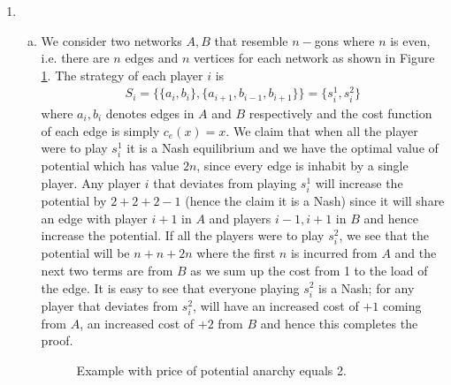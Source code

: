 \documentclass[a4paper,12pt]{article}
\theoremstyle{definition}
\begin{document}
\begin{enumerate}
\item
\begin{enumerate}[(a)]
\item We consider two networks $A, B$ that resemble $n-$gons where $n$ is even, i.e. there are $n$ edges and $n$ vertices for each network as shown in Figure \ref{fig:ngon}. The strategy of each player $i$ is 
\begin{align*}
S_i=\{\{a_i,b_i\},\{a_{i+1},b_{i-1},b_{i+1}\}\}=\{s_i^1,s_i^2\}
\end{align*}
where $a_i,b_i$ denotes edges in $A$ and $B$ respectively and the cost function of each edge is simply $c_e(x)=x$. We claim that when all the player were to play $s_i^1$ it is a Nash equilibrium and we have the optimal value of potential which has value $2n$, since every edge is inhabit by a single player. Any player $i$ that deviates from playing $s_i^1$ will increase the potential by $2+2+2-1$ (hence the claim it is a Nash) since it will share an edge with player $i+1$ in $A$ and players $i-1, i+1$ in $B$ and hence increase the potential. If all the players were to play $s_i^2$, we see that the potential will be $n+n+2n$ where the first $n$ is incurred from $A$ and the next two terms are from $B$ as we sum up the cost from 1 to the load of the edge. It is easy to see that everyone playing $s_i^2$ is a Nash; for any player that deviates from $s_i^2$, will have an increased cost of $+1$ coming from $A$, an increased cost of $+2$ from $B$ and hence this completes the proof. 



\newdimen\R
\R=2cm
\begin{figure}[h]
\centering
{}
\caption{Example with price of potential anarchy equals 2.}\label{fig:ngon}
\end{figure}


\end{enumerate}
\end{enumerate}
\end{document}
